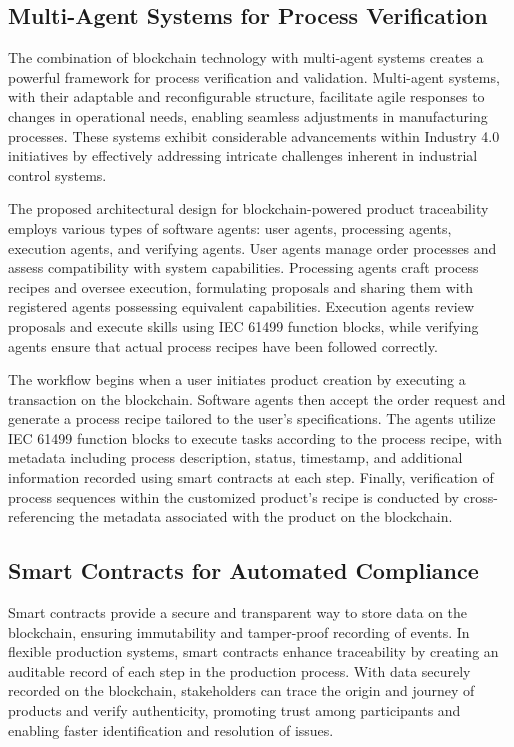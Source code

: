 \subsection{Multi-Agent Systems for Process Verification}

The combination of blockchain technology with multi-agent systems creates a powerful framework for process verification and validation. Multi-agent systems, with their adaptable and reconfigurable structure, facilitate agile responses to changes in operational needs, enabling seamless adjustments in manufacturing processes. These systems exhibit considerable advancements within Industry 4.0 initiatives by effectively addressing intricate challenges inherent in industrial control systems.

The proposed architectural design for blockchain-powered product traceability employs various types of software agents: user agents, processing agents, execution agents, and verifying agents. User agents manage order processes and assess compatibility with system capabilities. Processing agents craft process recipes and oversee execution, formulating proposals and sharing them with registered agents possessing equivalent capabilities. Execution agents review proposals and execute skills using IEC 61499 function blocks, while verifying agents ensure that actual process recipes have been followed correctly.

The workflow begins when a user initiates product creation by executing a transaction on the blockchain. Software agents then accept the order request and generate a process recipe tailored to the user's specifications. The agents utilize IEC 61499 function blocks to execute tasks according to the process recipe, with metadata including process description, status, timestamp, and additional information recorded using smart contracts at each step. Finally, verification of process sequences within the customized product's recipe is conducted by cross-referencing the metadata associated with the product on the blockchain.

\subsection{Smart Contracts for Automated Compliance}

Smart contracts provide a secure and transparent way to store data on the blockchain, ensuring immutability and tamper-proof recording of events. In flexible production systems, smart contracts enhance traceability by creating an auditable record of each step in the production process. With data securely recorded on the blockchain, stakeholders can trace the origin and journey of products and verify authenticity, promoting trust among participants and enabling faster identification and resolution of issues.

